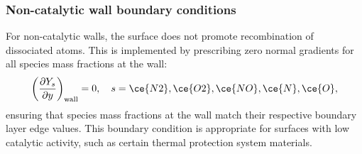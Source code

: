 


\subsubsection{Non-catalytic wall boundary conditions}

For non-catalytic walls, the surface does not promote recombination of dissociated atoms. This is implemented by prescribing zero normal gradients for all species mass fractions at the wall:
\begin{equation}
\left( \frac{\partial Y_s}{\partial y} \right)_{\text{wall}} = 0, \quad s = \ce{N2}, \ce{O2}, \ce{NO}, \ce{N}, \ce{O},
\end{equation}
ensuring that species mass fractions at the wall match their respective boundary layer edge values. This boundary condition is appropriate for surfaces with low catalytic activity, such as certain thermal protection system materials.

